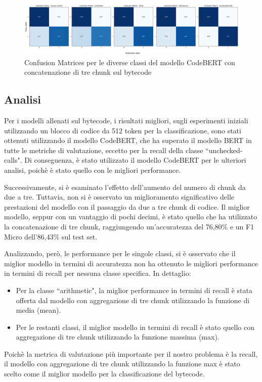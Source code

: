 \documentclass[../../Thesis.tex]{subfiles}
\begin{document}
\begin{figure}[h!]
    \includegraphics[width=1.05\textwidth]{../../img/CFConcat3-BC.png}
    \caption{Confusion Matrices per le diverse classi del modello CodeBERT con concatenazione di tre chunk sul bytecode}
\end{figure}

\subsection{Analisi}
Per i modelli allenati sul bytecode, i risultati migliori, sugli esperimenti iniziali utilizzando un blocco di codice da 512 token per la classificazione, sono stati ottenuti utilizzando il modello CodeBERT, che ha superato il modello BERT in tutte le metriche di valutazione, eccetto per la recall della classe ``unchecked-calls". Di conseguenza, \`e stato utilizzato il modello CodeBERT per le ulteriori analisi, poich\`e \`e stato quello con le migliori performance.

Successivamente, si \`e esaminato l'effetto dell'aumento del numero di chunk da due a tre. Tuttavia, non si \`e osservato un miglioramento significativo delle prestazioni del modello con il passaggio da due a tre chunk di codice. Il miglior modello, seppur con un vantaggio di pochi decimi, \`e stato quello che ha utilizzato la concatenazione di tre chunk, raggiungendo un'accuratezza del 76,80\% e un F1 Micro dell'86,43\% sul test set.

Analizzando, per\`o, le performance per le singole classi, si \`e osservato che il miglior modello in termini di accuratezza non ha ottenuto le migliori performance in termini di recall per nessuna classe specifica. In dettaglio:
\begin{itemize}
    \item Per la classe ``arithmetic", la miglior performance in termini di recall \`e stata offerta dal modello con aggregazione di tre chunk utilizzando la funzione di media (mean).
    \item Per le restanti classi, il miglior modello in termini di recall \`e stato quello con aggregazione di tre chunk utilizzando la funzione massima (max).
\end{itemize}
Poich\`e la metrica di valutazione pi\`u importante per il nostro problema \`e la recall, il modello con aggregazione di tre chunk utilizzando la funzione max \`e stato scelto come il miglior modello per la classificazione del bytecode.
\end{document}
